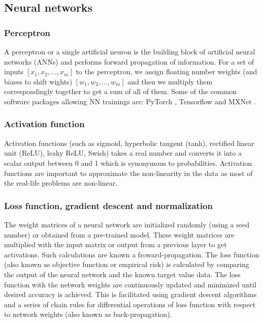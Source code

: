 \documentclass[pdflatex,sn-mathphys]{sn-jnl}%
\theoremstyle{thmstyleone}%
\theoremstyle{thmstyletwo}%
\theoremstyle{thmstylethree}%
\begin{document}
\subsection{Neural networks}\label{sec:neural-nets}
\subsubsection{Perceptron}

A perceptron or a single artificial neuron \cite{minsky2017perceptrons} is the building block of artificial neural networks (ANNs) and performs forward propagation of information. For a set of inputs $[x{_1},x{_2},...,x{_m}]$ to the perceptron, we assign floating number weights (and biases to shift wights) $[w{_1},w{_2},...,w{_m}]$ and then we multiply them correspondingly together to get a sum of all of them. Some of the common software packages \cite{nistdisclaimer} allowing NN trainings are: PyTorch \cite{paszke2019pytorch}, Tensorflow \cite{abadi2016tensorflow} and MXNet \cite{chen2015mxnet}.

\subsubsection{Activation function}

 Activation functions (such as sigmoid, hyperbolic tangent (tanh), rectified linear unit (ReLU), leaky ReLU, Swish) takes a real number and converts it into a scalar output between 0 and 1 which is synonymous to probabilities. Activation functions are important to approximate the non-linearity in the data as most of the real-life problems are non-linear. 


\subsubsection{Loss function, gradient descent and normalization}
The weight matrices of a neural network are initialized randomly (using a seed number) or obtained from a pre-trained model. These weight matrices are multiplied with the input matrix or output from a previous layer to get activations. Such calculations are known a froward-propagation. The loss function (also known as objective function or empirical risk) is calculated by comparing the output of the neural network and the known target value data. The loss function with the network weights are continuously updated and minimized until desired accuracy is achieved. This is facilitated using gradient descent algorithms and a series of chain rules for differential operations of loss function with respect to network weights (also known as back-propagation). 
\end{document}
